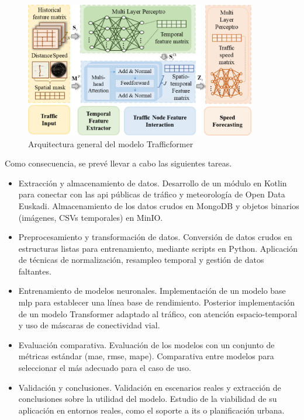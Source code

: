 \begin{figure}[H]
	\centering
	\includegraphics[width=0.9\textwidth]{includes/fnbot-19-1527908-g001.jpg}
	\caption{Arquitectura general del modelo Trafficformer \cite{trafficformer}}
	\label{fig:trafficformer}
\end{figure}

Como consecuencia, se prevé llevar a cabo las siguientes tareas.

\begin{itemize}
	\item Extracción y almacenamiento de datos. Desarrollo de un módulo en Kotlin para conectar con las \acrshort{api} públicas de tráfico y meteorología de Open Data Euskadi. Almacenamiento de los datos crudos en MongoDB y objetos binarios (imágenes, CSVs temporales) en MinIO.
	\item Preprocesamiento y transformación de datos. Conversión de datos crudos en estructuras listas para entrenamiento, mediante scripts en Python. Aplicación de técnicas de normalización, resampleo temporal y gestión de datos faltantes.
	\item Entrenamiento de modelos neuronales. Implementación de un modelo base \acrshort{mlp} para establecer una línea base de rendimiento. Posterior implementación de un modelo Transformer adaptado al tráfico, con atención espacio-temporal y uso de máscaras de conectividad vial.
	\item Evaluación comparativa. Evaluación de los modelos con un conjunto de métricas estándar (\acrshort{mae}, \acrshort{rmse}, \acrshort{mape}). Comparativa entre modelos para seleccionar el más adecuado para el caso de uso.
	\item Validación y conclusiones. Validación en escenarios reales y extracción de conclusiones sobre la utilidad del modelo. Estudio de la viabilidad de su aplicación en entornos reales, como el soporte a \acrshort{its} o planificación urbana.
\end{itemize}
